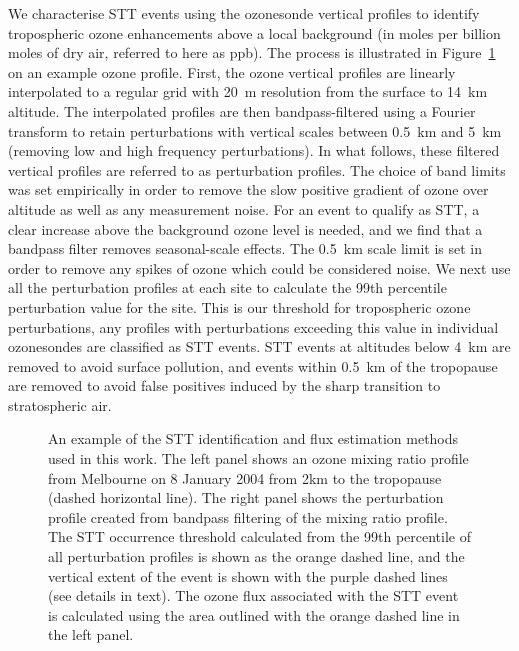     We characterise STT events using the ozonesonde vertical profiles to identify tropospheric ozone enhancements above a local background (in moles per billion moles of dry air, referred to here as ppb).
    The process is illustrated in Figure~\ref{fig:filterEG} on an example ozone profile.
    First, the ozone vertical profiles are linearly interpolated to a regular grid with 20~m resolution from the surface to 14~km altitude. 
    The interpolated profiles are then bandpass-filtered using a Fourier transform to retain perturbations with vertical scales between 0.5~km and 5~km (removing low and high frequency perturbations).
    In what follows, these filtered vertical profiles are referred to as perturbation profiles.
    The choice of band limits was set empirically in order to remove the slow positive gradient of ozone over altitude as well as any measurement noise.
    For an event to qualify as STT, a clear increase above the background ozone level is needed, and we find that a bandpass filter removes seasonal-scale effects.
    The 0.5~km scale limit is set in order to remove any spikes of ozone which could be considered noise.
    We next use all the perturbation profiles at each site to calculate the 99th percentile perturbation value for the site.
    This is our threshold for tropospheric ozone perturbations, any profiles with perturbations exceeding this value in individual ozonesondes are classified as STT events.
    STT events at altitudes below 4~km are removed to avoid surface pollution, and events within 0.5~km of the tropopause are removed to avoid false positives induced by the sharp transition to stratospheric air.
    
    \begin{figure}[t]
      
      \caption{ %
	An example of the STT identification and flux estimation methods used in this work. 
	The left panel shows an ozone mixing ratio profile from Melbourne on 8 January 2004 from 2km to the tropopause (dashed horizontal line).
	The right panel shows the perturbation profile created from bandpass filtering of the mixing ratio profile. The STT occurrence threshold calculated from the 99th percentile of all perturbation profiles is shown as the orange dashed line, and the vertical extent of the event is shown with the purple dashed lines (see details in text).
	The ozone flux associated with the STT event is calculated using the area outlined with the orange dashed line in the left panel.
      }
      \label{fig:filterEG}
      
    \end{figure}
   
